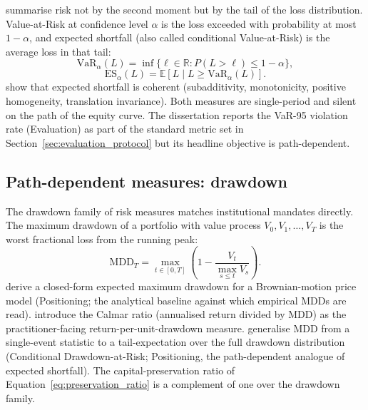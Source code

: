 \textcite{rockafellar2000optimization} summarise risk not by the second moment but by the tail of the loss distribution. Value-at-Risk at confidence level $\alpha$ is the loss exceeded with probability at most $1 - \alpha$, and expected shortfall (also called conditional Value-at-Risk) is the average loss in that tail:
\begin{equation}
  \label{eq:var}
  \mathrm{VaR}_\alpha(L) = \inf \{ \ell \in \mathbb{R} : P(L > \ell) \leq 1 - \alpha \},
\end{equation}
\begin{equation}
  \label{eq:es}
  \mathrm{ES}_\alpha(L) = \mathbb{E}[L \mid L \geq \mathrm{VaR}_\alpha(L)].
\end{equation}
\textcite{artzner1999coherent} show that expected shortfall is coherent (subadditivity, monotonicity, positive homogeneity, translation invariance). Both measures are single-period and silent on the path of the equity curve. The dissertation reports the VaR-95 violation rate (Evaluation) as part of the standard metric set in Section~\ref{sec:evaluation_protocol} but its headline objective is path-dependent.

\subsection{Path-dependent measures: drawdown}
\label{sec:drawdown}

The drawdown family of risk measures matches institutional mandates directly. The maximum drawdown of a portfolio with value process $V_0, V_1, \ldots, V_T$ is the worst fractional loss from the running peak:
\begin{equation}
  \label{eq:mdd}
  \mathrm{MDD}_T = \max_{t \in [0, T]} \left( 1 - \frac{V_t}{\max_{s \leq t} V_s} \right).
\end{equation}
\textcite{magdon2004sample} derive a closed-form expected maximum drawdown for a Brownian-motion price model (Positioning; the analytical baseline against which empirical MDDs are read). \textcite{young1991calmar} introduce the Calmar ratio (annualised return divided by MDD) as the practitioner-facing return-per-unit-drawdown measure. \textcite{chekhlov2005drawdown} generalise MDD from a single-event statistic to a tail-expectation over the full drawdown distribution (Conditional Drawdown-at-Risk; Positioning, the path-dependent analogue of expected shortfall). The capital-preservation ratio of Equation~\ref{eq:preservation_ratio} is a complement of one over the drawdown family.

